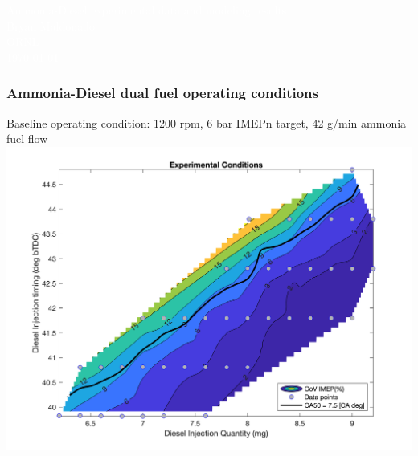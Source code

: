 \documentclass[aspectratio=169, 10pt]{beamer}
\begin{document}
%
%
{
\begin{frame}
\textcolor{white}{\Huge Ammonia-Diesel experimental data and modeling results}\\
\vspace*{0.7cm}
\textcolor{white}{\Large Bryan Maldonado}\\
\textcolor{white}{ ORNL}\\
\textcolor{white}{ \today}


\end{frame}
}

%
%

\begin{frame}
\frametitle{Ammonia-Diesel dual fuel operating conditions}
	\centering
		Baseline operating condition: 1200 rpm, 6 bar IMEPn target, 42 g/min ammonia fuel flow
		\includegraphics[height=0.85\textheight]{../Model_Plots/Overview.png}
\end{frame}
\end{document}
